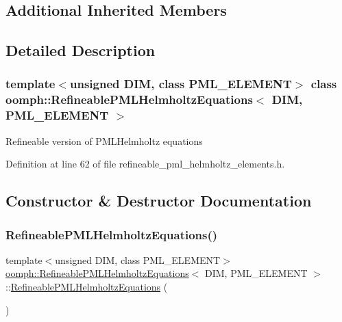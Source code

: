 \subsection*{Additional Inherited Members}


\subsection{Detailed Description}
\subsubsection*{template$<$unsigned D\+IM, class P\+M\+L\+\_\+\+E\+L\+E\+M\+E\+NT$>$\newline
class oomph\+::\+Refineable\+P\+M\+L\+Helmholtz\+Equations$<$ D\+I\+M, P\+M\+L\+\_\+\+E\+L\+E\+M\+E\+N\+T $>$}

Refineable version of P\+M\+L\+Helmholtz equations 

Definition at line 62 of file refineable\+\_\+pml\+\_\+helmholtz\+\_\+elements.\+h.



\subsection{Constructor \& Destructor Documentation}
\mbox{\label{classoomph_1_1RefineablePMLHelmholtzEquations_a1a2fe7b1a39e8f6a46d23f1924295804}} 
\subsubsection{\texorpdfstring{Refineable\+P\+M\+L\+Helmholtz\+Equations()}{RefineablePMLHelmholtzEquations()}\hspace{0.1cm}{\footnotesize\ttfamily [1/2]}}
{\footnotesize\ttfamily template$<$unsigned D\+IM, class P\+M\+L\+\_\+\+E\+L\+E\+M\+E\+NT$>$ \\
\hyperlink{classoomph_1_1RefineablePMLHelmholtzEquations}{oomph\+::\+Refineable\+P\+M\+L\+Helmholtz\+Equations}$<$ D\+IM, P\+M\+L\+\_\+\+E\+L\+E\+M\+E\+NT $>$\+::\hyperlink{classoomph_1_1RefineablePMLHelmholtzEquations}{Refineable\+P\+M\+L\+Helmholtz\+Equations} (\begin{DoxyParamCaption}{ }\end{DoxyParamCaption})\hspace{0.3cm}{\ttfamily [inline]}}




